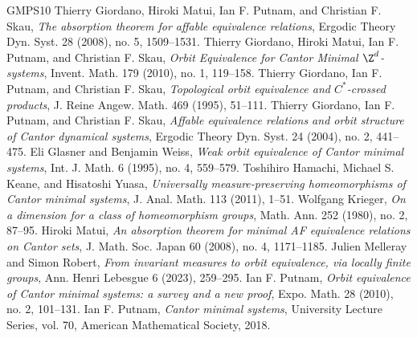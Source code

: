 \begin{thebibliography}{GMPS10}
 Thierry Giordano, Hiroki Matui, Ian F. Putnam, and Christian F. Skau, \emph{The absorption theorem for affable equivalence relations}, Ergodic Theory Dyn. Syst. 28 (2008), no. 5, 1509--1531.
 Thierry Giordano, Hiroki Matui, Ian F. Putnam, and Christian F. Skau, \emph{Orbit Equivalence for Cantor Minimal $\Z^d$-systems}, Invent. Math. 179 (2010), no. 1, 119--158.
 Thierry Giordano, Ian F. Putnam, and Christian F. Skau, \emph{Topological orbit equivalence and $C^*$-crossed products}, J. Reine Angew. Math. 469 (1995), 51--111.
 Thierry Giordano, Ian F. Putnam, and Christian F. Skau, \emph{Affable equivalence relations and orbit structure of Cantor dynamical systems}, Ergodic Theory Dyn. Syst. 24 (2004), no. 2, 441--475.
 Eli Glasner and Benjamin Weiss, \emph{Weak orbit equivalence of Cantor minimal systems}, Int. J. Math. 6 (1995), no. 4, 559--579.
 Toshihiro Hamachi, Michael S. Keane, and Hisatoshi Yuasa, \emph{Universally measure-preserving homeomorphisms of Cantor minimal systems}, J. Anal. Math. 113 (2011), 1--51.
 Wolfgang Krieger, \emph{On a dimension for a class of homeomorphism groups}, Math. Ann. 252 (1980), no. 2, 87--95.
 Hiroki Matui, \emph{An absorption theorem for minimal AF equivalence relations on Cantor sets}, J. Math. Soc. Japan 60 (2008), no. 4, 1171--1185.
 Julien Melleray and Simon Robert, \emph{From invariant measures to orbit equivalence, via locally finite groups}, Ann. Henri Lebesgue 6 (2023), 259--295.
 Ian F. Putnam, \emph{Orbit equivalence of Cantor minimal systems: a survey and a new proof}, Expo. Math. 28 (2010), no. 2, 101--131.
 Ian F. Putnam, \emph{Cantor minimal systems}, University Lecture Series, vol. 70, American Mathematical Society, 2018.
\end{thebibliography}

